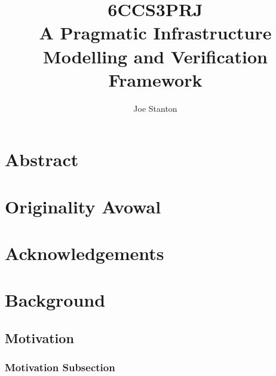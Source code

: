 \documentclass{cshonours}
\title{6CCS3PRJ \\
  A Pragmatic Infrastructure Modelling and Verification Framework}
\author{Joe Stanton}
\begin{document}
\maketitle

\chapter*{Abstract}
\chapter*{Originality Avowal}
\chapter*{Acknowledgements}

\tableofcontents

\chapter{Background}
\section{Motivation}
\subsection{Motivation Subsection}
% 
% 
% 
% 
% 
% 
% 

\printbibliography[title=References]
% 
\end{document}
